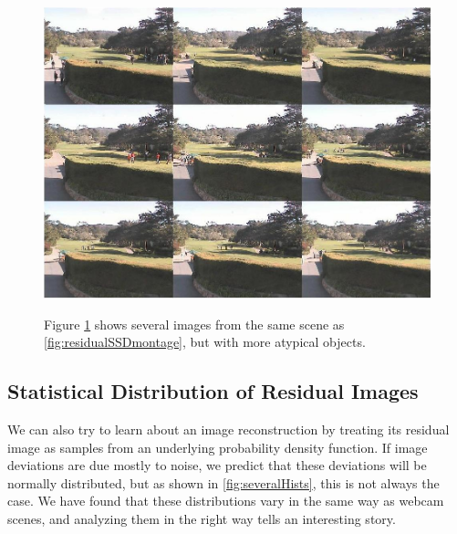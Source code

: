 \begin{figure}
	\centering
		\includegraphics[width=1\textwidth]{figures/residualZScoreMontage.jpg}
	\label{fig:residualZScoreMontage}
	
		\caption[Z-Score Montage.]{Figure \ref{fig:residualZScoreMontage} shows several images from the same scene as \ref{fig:residualSSDmontage}, but with more atypical objects.}
\end{figure}





\subsection{Statistical Distribution of Residual Images}

We can also try to learn about an image reconstruction by treating its residual image as samples from an 
underlying probability density function.  If image deviations are due mostly to noise, we predict that these deviations will be normally distributed, but as shown in \ref{fig:severalHists}, this is not always the case.  We have found that these distributions vary in the same way as webcam scenes, and analyzing them in the right way tells an interesting story.


